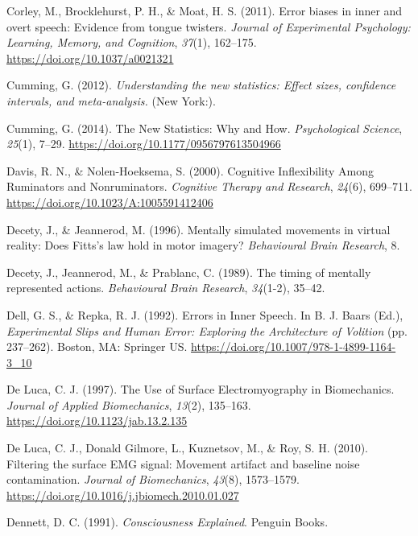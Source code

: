 \documentclass[a4paper,12pt,twoside,openright,oldfontcommands]{memoir}
\begin{document}
\leavevmode\hypertarget{ref-corley_error_2011}{}%
Corley, M., Brocklehurst, P. H., \& Moat, H. S. (2011). Error biases in inner and overt speech: Evidence from tongue twisters. \emph{Journal of Experimental Psychology: Learning, Memory, and Cognition}, \emph{37}(1), 162--175. \url{https://doi.org/10.1037/a0021321}

\leavevmode\hypertarget{ref-Cumming2012}{}%
Cumming, G. (2012). \emph{Understanding the new statistics: Effect sizes, confidence intervals, and meta-analysis.} (New York:).

\leavevmode\hypertarget{ref-cumming_new_2014}{}%
Cumming, G. (2014). The New Statistics: Why and How. \emph{Psychological Science}, \emph{25}(1), 7--29. \url{https://doi.org/10.1177/0956797613504966}

\leavevmode\hypertarget{ref-Davis2000}{}%
Davis, R. N., \& Nolen-Hoeksema, S. (2000). Cognitive Inflexibility Among Ruminators and Nonruminators. \emph{Cognitive Therapy and Research}, \emph{24}(6), 699--711. \url{https://doi.org/10.1023/A:1005591412406}

\leavevmode\hypertarget{ref-decety_mentally_1996}{}%
Decety, J., \& Jeannerod, M. (1996). Mentally simulated movements in virtual reality: Does Fitts's law hold in motor imagery? \emph{Behavioural Brain Research}, 8.

\leavevmode\hypertarget{ref-decety_timing_1989}{}%
Decety, J., Jeannerod, M., \& Prablanc, C. (1989). The timing of mentally represented actions. \emph{Behavioural Brain Research}, \emph{34}(1-2), 35--42.

\leavevmode\hypertarget{ref-dell_errors_1992}{}%
Dell, G. S., \& Repka, R. J. (1992). Errors in Inner Speech. In B. J. Baars (Ed.), \emph{Experimental Slips and Human Error: Exploring the Architecture of Volition} (pp. 237--262). Boston, MA: Springer US. \url{https://doi.org/10.1007/978-1-4899-1164-3_10}

\leavevmode\hypertarget{ref-de_luca_use_1997}{}%
De Luca, C. J. (1997). The Use of Surface Electromyography in Biomechanics. \emph{Journal of Applied Biomechanics}, \emph{13}(2), 135--163. \url{https://doi.org/10.1123/jab.13.2.135}

\leavevmode\hypertarget{ref-de_luca_filtering_2010}{}%
De Luca, C. J., Donald Gilmore, L., Kuznetsov, M., \& Roy, S. H. (2010). Filtering the surface EMG signal: Movement artifact and baseline noise contamination. \emph{Journal of Biomechanics}, \emph{43}(8), 1573--1579. \url{https://doi.org/10.1016/j.jbiomech.2010.01.027}

\leavevmode\hypertarget{ref-dennett_consciousness_1991}{}%
Dennett, D. C. (1991). \emph{Consciousness Explained}. Penguin Books.
\end{document}
